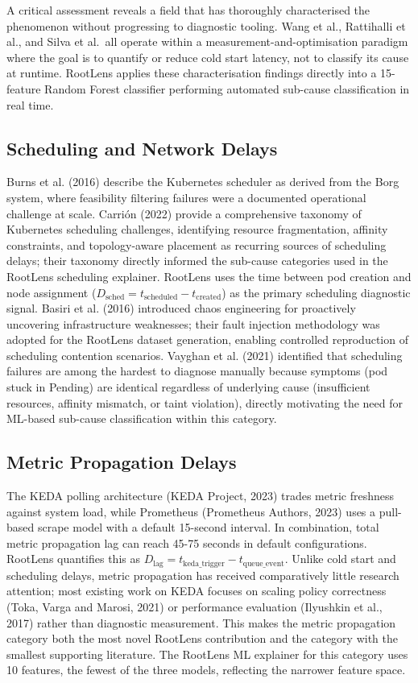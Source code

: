 A critical assessment reveals a field that has thoroughly characterised the phenomenon without progressing to diagnostic tooling. Wang et al., Rattihalli et al., and Silva et al.\ all operate within a measurement-and-optimisation paradigm where the goal is to quantify or reduce cold start latency, not to classify its cause at runtime. RootLens applies these characterisation findings directly into a 15-feature Random Forest classifier performing automated sub-cause classification in real time.

\subsection{Scheduling and Network Delays}
Burns et al. (2016) describe the Kubernetes scheduler as derived from the Borg system, where feasibility filtering failures were a documented operational challenge at scale. Carri\'on (2022) provide a comprehensive taxonomy of Kubernetes scheduling challenges, identifying resource fragmentation, affinity constraints, and topology-aware placement as recurring sources of scheduling delays; their taxonomy directly informed the sub-cause categories used in the RootLens scheduling explainer. RootLens uses the time between pod creation and node assignment ($D_{\text{sched}} = t_{\text{scheduled}} - t_{\text{created}}$) as the primary scheduling diagnostic signal. Basiri et al. (2016) introduced chaos engineering for proactively uncovering infrastructure weaknesses; their fault injection methodology was adopted for the RootLens dataset generation, enabling controlled reproduction of scheduling contention scenarios. Vayghan et al. (2021) identified that scheduling failures are among the hardest to diagnose manually because symptoms (pod stuck in Pending) are identical regardless of underlying cause (insufficient resources, affinity mismatch, or taint violation), directly motivating the need for ML-based sub-cause classification within this category.

\subsection{Metric Propagation Delays}
The KEDA polling architecture (KEDA Project, 2023) trades metric freshness against system load, while Prometheus (Prometheus Authors, 2023) uses a pull-based scrape model with a default 15-second interval. In combination, total metric propagation lag can reach 45-75 seconds in default configurations. RootLens quantifies this as $D_{\text{lag}} = t_{\text{keda\_trigger}} - t_{\text{queue\_event}}$. Unlike cold start and scheduling delays, metric propagation has received comparatively little research attention; most existing work on KEDA focuses on scaling policy correctness (Toka, Varga and Marosi, 2021) or performance evaluation (Ilyushkin et al., 2017) rather than diagnostic measurement. This makes the metric propagation category both the most novel RootLens contribution and the category with the smallest supporting literature. The RootLens ML explainer for this category uses 10 features, the fewest of the three models, reflecting the narrower feature space.

